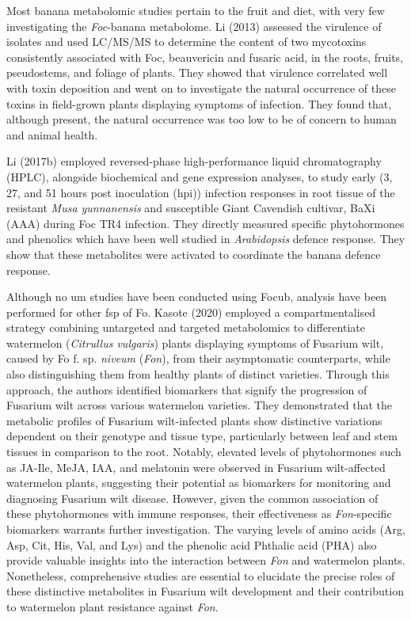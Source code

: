 Most banana metabolomic studies pertain to the fruit and diet, with very few investigating the \textit{Foc}-banana metabolome. Li \et (2013) assessed the virulence of \Foc isolates and used LC/MS/MS to determine the content of two mycotoxins consistently associated with Foc, beauvericin and fusaric acid, in the roots, fruits, pseudostems, and foliage of plants. They showed that virulence correlated well with toxin deposition and went on to investigate the natural occurrence of these toxins in field-grown plants displaying symptoms of \Foc infection. They found that, although present, the natural occurrence was too low to be of concern to human and animal health. 

Li \et (2017b) employed reversed-phase high-performance liquid chromatography (HPLC), alongside biochemical and gene expression analyses, to study early (3, 27, and 51 hours post inoculation (hpi)) infection responses in root tissue of the resistant \textit{Musa yunnanensis} and susceptible Giant Cavendish cultivar, BaXi (\Musa AAA) during Foc TR4 infection. They directly measured specific phytohormones and phenolics which have been well studied in \textit{Arabidopsis} defence response. They show that these metabolites were activated to coordinate the banana defence response.

Although no \ac{um} studies have been conducted using \ac{Focub}, analysis have been performed for other \ac{fsp} of \ac{Fo}. Kasote \et (2020) employed a compartmentalised strategy combining untargeted and targeted metabolomics to differentiate watermelon (\textit{Citrullus vulgaris}) plants displaying symptoms of Fusarium wilt, caused by \ac{Fo} f. sp. \textit{niveum} (\textit{Fon}), from their asymptomatic counterparts, while also distinguishing them from healthy plants of distinct varieties. Through this approach, the authors identified biomarkers that signify the progression of Fusarium wilt across various watermelon varieties. They demonstrated that the metabolic profiles of Fusarium wilt-infected plants show distinctive variations dependent on their genotype and tissue type, particularly between leaf and stem tissues in comparison to the root. Notably, elevated levels of phytohormones such as JA-Ile, MeJA, IAA, and melatonin were observed in Fusarium wilt-affected watermelon plants, suggesting their potential as biomarkers for monitoring and diagnosing Fusarium wilt disease. However, given the common association of these phytohormones with immune responses, their effectiveness as \textit{Fon}-specific biomarkers warrants further investigation. The varying levels of amino acids (Arg, Asp, Cit, His, Val, and Lys) and the phenolic acid Phthalic acid (PHA) also provide valuable insights into the interaction between \textit{Fon} and watermelon plants. Nonetheless, comprehensive studies are essential to elucidate the precise roles of these distinctive metabolites in Fusarium wilt development and their contribution to watermelon plant resistance against \textit{Fon}.

